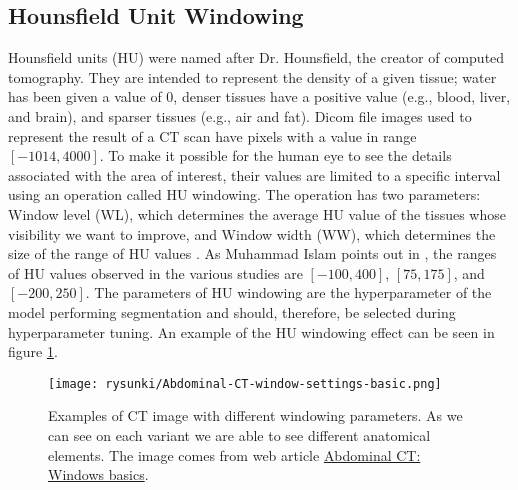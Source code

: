 \subsection{Hounsfield Unit Windowing}
Hounsfield units (HU) were named after Dr. Hounsfield, the creator of computed tomography. They are intended to represent the density of a given tissue; water has been given a value of 0, denser tissues have a positive value (e.g., blood, liver, and brain), and sparser tissues (e.g., air and fat). Dicom file images used to represent the result of a CT scan have pixels with a value in range $[-1014, 4000]$. To make it possible for the human eye to see the details associated with the area of interest, their values are limited to a specific interval using an operation called HU windowing. The operation has two parameters: Window level (WL), which determines the average HU value of the tissues whose visibility we want to improve, and Window width (WW), which determines the size of the range of HU values \cite{whalen_slice_2003}. As Muhammad Islam points out in \cite{islam_evaluation_2021}, the ranges of HU values observed in the various studies are $[-100, 400]$, $[75, 175]$, and $[-200, 250]$. The parameters of HU windowing are the hyperparameter of the model performing segmentation and should, therefore, be selected during hyperparameter tuning. An example of the HU windowing effect can be seen in figure \ref{rys:hu windowing}.

\begin{figure}[!h]
	\centering \texttt{[image: rysunki/Abdominal-CT-window-settings-basic.png]}
	\caption{Examples of CT image with different windowing parameters. As we can see on each variant we are able to see different anatomical elements. The image comes from web article \href{https://litfl.com/abdominal-ct-windows-basics/}{Abdominal CT: Windows basics}.  } 
	\label{rys:hu windowing}
\end{figure}


